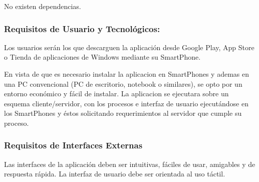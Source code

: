             
            No existen dependencias.
            
          \subsubsection{Requisitos de Usuario y Tecnológicos:}
        
            
            Los usuarios serán los que descarguen la aplicación desde Google Play, App Store o Tienda de aplicaciones de Windows mediante su SmartPhone.
            
            
            En vista de que es necesario instalar la aplicacion en SmartPhones y ademas en una PC convencional (PC de escritorio, notebook o similares), se opto por un entorno económico y fácil de instalar. La aplicacion se ejecutara sobre un esquema cliente/servidor, con los procesos e interfaz de usuario ejecutándose en los SmartPhones y éstos solicitando requerimientos al servidor que cumple su proceso.
            
        \subsubsection{Requisitos de Interfaces Externas}
        
            
            Las interfaces de la aplicación deben ser intuitivas, fáciles de usar, amigables y de respuesta rápida. La interfaz de usuario debe ser orientada al uso táctil.
            
            
